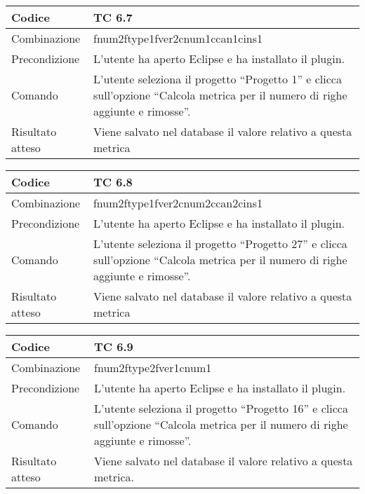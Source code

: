 \begin{table}[ht]
\begin{tabular}{|p{3cm}|p{9cm}|}
\hline
\cellcolor{lightgray}Codice				& TC 6.7								\\
\hline
\cellcolor{lightgray}Combinazione		& fnum2ftype1fver2cnum1ccan1cins1 									\\
\hline
\cellcolor{lightgray}Precondizione		& L'utente ha aperto Eclipse e ha installato il plugin.								\\
\hline
\cellcolor{lightgray}Comando			& L'utente seleziona il progetto ``Progetto 1''  e clicca sull'opzione ``Calcola metrica per il numero di righe aggiunte e rimosse''.	\\
\hline
\cellcolor{lightgray}Risultato atteso	& Viene salvato nel database il valore relativo a questa metrica	\\
\hline
\end{tabular}
\end{table}

\begin{table}[ht]
\begin{tabular}{|p{3cm}|p{9cm}|}
\hline
\cellcolor{lightgray}Codice				& TC 6.8								\\
\hline
\cellcolor{lightgray}Combinazione		& fnum2ftype1fver2cnum2ccan2cins1 									\\
\hline
\cellcolor{lightgray}Precondizione		& L'utente ha aperto Eclipse e ha installato il plugin.									\\
\hline
\cellcolor{lightgray}Comando			& L'utente seleziona il progetto ``Progetto 27''  e clicca sull'opzione ``Calcola metrica per il numero di righe aggiunte e rimosse''.	\\
\hline
\cellcolor{lightgray}Risultato atteso	& Viene salvato nel database il valore relativo a questa metrica	\\
\hline
\end{tabular}
\end{table}

\begin{table}[ht]
\begin{tabular}{|p{3cm}|p{9cm}|}
\hline
\cellcolor{lightgray}Codice				& TC 6.9								\\
\hline
\cellcolor{lightgray}Combinazione		& fnum2ftype2fver1cnum1									\\
\hline
\cellcolor{lightgray}Precondizione		& L'utente ha aperto Eclipse e ha installato il plugin.		\\
\hline
\cellcolor{lightgray}Comando			& L'utente seleziona il progetto ``Progetto 16''  e clicca sull'opzione ``Calcola metrica per il numero di righe aggiunte e rimosse''.	\\
\hline
\cellcolor{lightgray}Risultato atteso	& Viene salvato nel database il valore relativo a questa metrica.\\
\hline
\end{tabular}
\end{table}

